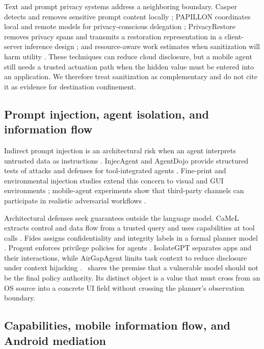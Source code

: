 Text and prompt privacy systems address a neighboring boundary. Casper detects and removes sensitive prompt content locally \cite{chong2024casper}; PAPILLON coordinates local and remote models for privacy-conscious delegation \cite{siyan2025papillon}; PrivacyRestore removes privacy spans and transmits a restoration representation in a client-server inference design \cite{zeng2025privacyrestore}; and resource-aware work estimates when sanitization will harm utility \cite{carpentier2024preempting}. These techniques can reduce cloud disclosure, but a mobile agent still needs a trusted actuation path when the hidden value must be entered into an application. We therefore treat sanitization as complementary and do not cite it as evidence for destination confinement.

\subsection{Prompt injection, agent isolation, and information flow}

Indirect prompt injection is an architectural risk when an agent interprets untrusted data as instructions \cite{greshake2023indirect}. InjecAgent and AgentDojo provide structured tests of attacks and defenses for tool-integrated agents \cite{zhan2024injecagent,debenedetti2024agentdojo}. Fine-print and environmental injection studies extend this concern to visual and GUI environments \cite{chen2025fineprint,liao2024eia,chen2025aeia}; mobile-agent experiments show that third-party channels can participate in realistic adversarial workflows \cite{du2025mobileattacks}.

Architectural defenses seek guarantees outside the language model. CaMeL extracts control and data flow from a trusted query and uses capabilities at tool calls \cite{debenedetti2025camel}. Fides assigns confidentiality and integrity labels in a formal planner model \cite{costa2025fides}. Progent enforces privilege policies for agents \cite{shi2025progent}. IsolateGPT separates apps and their interactions, while AirGapAgent limits task context to reduce disclosure under context hijacking \cite{wu2025isolategpt,bagdasarian2024airgap}. \SH\ shares the premise that a vulnerable model should not be the final policy authority. Its distinct object is a value that must cross from an OS source into a concrete UI field without crossing the planner's observation boundary.

\subsection{Capabilities, mobile information flow, and Android mediation}

